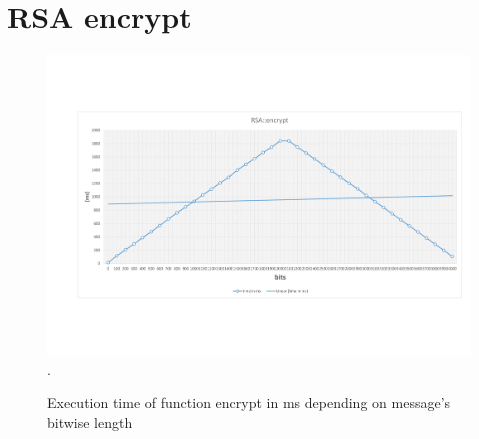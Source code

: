 \documentclass[oneside,openright,12pt,final,en]{mgr}
\begin{document}
\section{RSA encrypt}

\begin{figure}[H]
	\centering
	\includegraphics[width=\textwidth,trim={0.5cm 2.8cm 0.4cm 2.8cm},clip]{rsa.pdf}.
	\caption{Execution time of function encrypt in ms depending on message's bitwise length}
	\label{fig:rsa}
\end{figure}



 \listoffigures
 \listoftables
\end{document}

